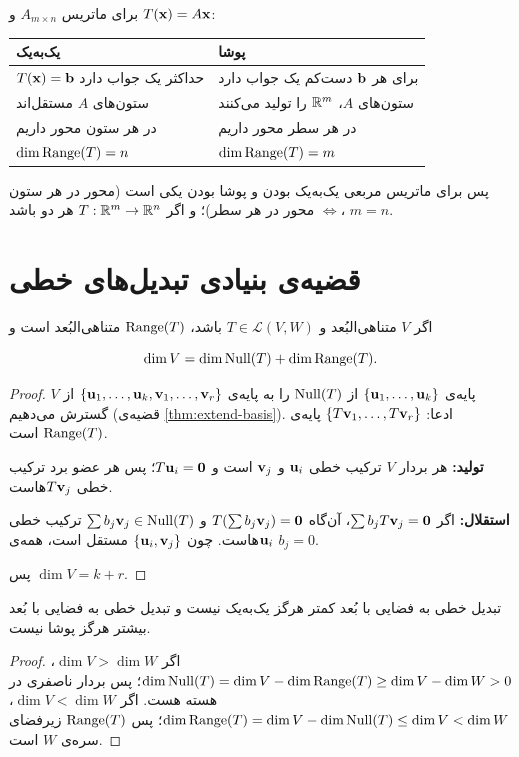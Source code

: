 برای ماتریس $A_{m\times n}$ و $T(\mathbf{x})=A\mathbf{x}$:
\begin{center}
\renewcommand{\arraystretch}{1.35}
\begin{tabular}{p{6.3cm}p{6.3cm}}
\toprule
\textbf{یک‌به‌یک} & \textbf{پوشا}\\
\midrule
$T(\mathbf{x})=\mathbf{b}$ حداکثر یک جواب دارد & برای هر $\mathbf{b}$ دست‌کم یک جواب دارد\\
ستون‌های $A$ مستقل‌اند & ستون‌های $A$، $\mathbb{R}^m$ را تولید می‌کنند\\
در هر ستون محور داریم & در هر سطر محور داریم\\
$\dim\operatorname{Range}(T)=n$ & $\dim\operatorname{Range}(T)=m$\\
\bottomrule
\end{tabular}
\end{center}
پس برای ماتریس مربعی یک‌به‌یک بودن و پوشا بودن یکی است (محور در هر ستون $\iff$ محور در هر سطر)؛ و اگر $T:\mathbb{R}^m\to\mathbb{R}^n$ هر دو باشد، $m=n$.

\section{قضیه‌ی بنیادی تبدیل‌های خطی}

\begin{theorem}\label{thm:rank-nullity-map}
اگر $V$ متناهی‌البُعد  و $T\in\mathcal{L}(V,W)$ باشد، $\operatorname{Range}(T)$ متناهی‌البُعد است و
\begin{keyformula}
\[
\dim V=\dim\operatorname{Null}(T)+\dim\operatorname{Range}(T).
\]
\end{keyformula}
\end{theorem}
\begin{proof}
پایه‌ی  $\{\mathbf{u}_1,\dots,\mathbf{u}_k\}$ از $\operatorname{Null}(T)$ را به پایه‌ی $\{\mathbf{u}_1,\dots,\mathbf{u}_k,\mathbf{v}_1,\dots,\mathbf{v}_r\}$ از $V$ گسترش می‌دهیم (قضیه‌ی \ref{thm:extend-basis}). ادعا: $\{T\mathbf{v}_1,\dots,T\mathbf{v}_r\}$ پایه‌ی $\operatorname{Range}(T)$ است.

\textbf{تولید:} هر بردار $V$ ترکیب خطی $\mathbf{u}_i$ و $\mathbf{v}_j$ است و $T\mathbf{u}_i=\mathbf{0}$؛ پس هر عضو برد ترکیب خطی $T\mathbf{v}_j$هاست.

\textbf{استقلال:} اگر $\sum b_jT\mathbf{v}_j=\mathbf{0}$، آن‌گاه $T(\sum b_j\mathbf{v}_j)=\mathbf{0}$ و $\sum b_j\mathbf{v}_j\in\operatorname{Null}(T)$ ترکیب خطی $\mathbf{u}_i$هاست. چون $\{\mathbf{u}_i,\mathbf{v}_j\}$ مستقل است، همه‌ی $b_j=0$.

پس $\dim V=k+r$.
\end{proof}

\begin{corollary}\label{cor:map-dims}
تبدیل خطی به فضایی با بُعد  کمتر هرگز یک‌به‌یک نیست و تبدیل خطی به فضایی با بُعد بیشتر هرگز پوشا نیست.
\end{corollary}
\begin{proof}
اگر $\dim V>\dim W$، $\dim\operatorname{Null}(T)=\dim V-\dim\operatorname{Range}(T)\ge\dim V-\dim W>0$؛ پس بردار ناصفری در هسته هست. اگر $\dim V<\dim W$، $\dim\operatorname{Range}(T)=\dim V-\dim\operatorname{Null}(T)\le\dim V<\dim W$؛ پس $\operatorname{Range}(T)$ زیرفضای سره‌ی  $W$ است.
\end{proof}

